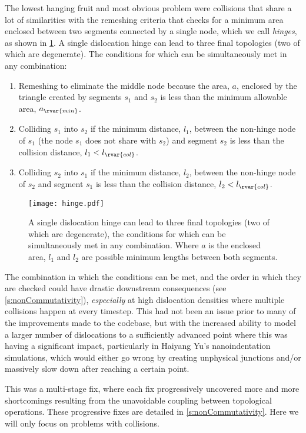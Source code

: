 The lowest hanging fruit and most obvious problem were collisions that share a lot of similarities with the remeshing criteria that checks for a minimum area enclosed between two segments connected by a single node, which we call \emph{hinges}, as shown in \cref{f:hinge}. A single dislocation hinge can lead to three final topologies (two of which are degenerate). The conditions for which can be simultaneously met in any combination:
\begin{enumerate}
    \item Remeshing to eliminate the middle node because the area, $a$, enclosed by the triangle created by segments $s_1$ and $s_2$ is less than the minimum allowable area, $a_{\rvar{min}}$.
    \item Colliding $s_1$ into $s_2$ if the minimum distance, $l_1$, between the non-hinge node of $s_1$ (the node $s_1$ does not share with $s_2$) and segment $s_2$ is less than the collision distance, $l_1 < l_{\rvar{col}}$.
    \item Colliding $s_2$ into $s_1$ if the minimum distance, $l_2$, between the non-hinge node of $s_2$ and segment $s_1$ is less than the collision distance, $l_2 < l_{\rvar{col}}$.
\end{enumerate}
\begin{figure}
    \centering
    \texttt{[image: hinge.pdf]}
    \caption[A single dislocation hinge can lead to three different final topologies.]{A single dislocation hinge can lead to three final topologies (two of which are degenerate), the conditions for which can be simultaneously met in any combination. Where $a$ is the enclosed area, $l_1$ and $l_2$ are possible minimum lengths between both segments.}
    \label{f:hinge}
\end{figure}

The combination in which the conditions can be met, and the order in which they are checked could have drastic downstream consequences (see \cref{s:nonCommutativity}), \emph{especially} at high dislocation densities where multiple collisions happen at every timestep. This had not been an issue prior to many of the improvements made to the codebase, but with the increased ability to model a larger number of dislocations to a sufficiently advanced point where this was having a significant impact, particularly in Haiyang Yu's nanoindentation simulations, which would either go wrong by creating unphysical junctions and/or massively slow down after reaching a certain point.

This was a multi-stage fix, where each fix progressively uncovered more and more shortcomings resulting from the unavoidable coupling between topological operations. These progressive fixes are detailed in \cref{s:nonCommutativity}. Here we will only focus on problems with collisions.

